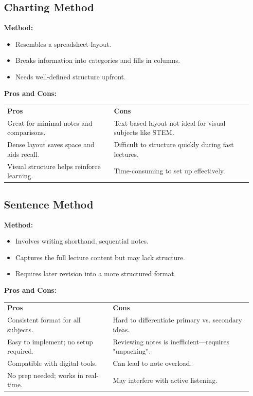 \vspace{1em}
\subsection*{Charting Method}

\textbf{Method:}
\begin{itemize}
    \item Resembles a spreadsheet layout.
    \item Breaks information into categories and fills in columns.
    \item Needs well-defined structure upfront.
\end{itemize}

\textbf{Pros and Cons:}

\begin{tabularx}{\textwidth}{>{\raggedright\arraybackslash}X>{\raggedright\arraybackslash}X}
    \rowcolor{gray!15} \textbf{Pros}           & \textbf{Cons}                                              \\
    Great for minimal notes and comparisons.   & Text-based layout not ideal for visual subjects like STEM. \\
    Dense layout saves space and aids recall.  & Difficult to structure quickly during fast lectures.       \\
    Visual structure helps reinforce learning. & Time-consuming to set up effectively.                      \\
\end{tabularx}

\vspace{1em}
\subsection*{Sentence Method}

\textbf{Method:}
\begin{itemize}
    \item Involves writing shorthand, sequential notes.
    \item Captures the full lecture content but may lack structure.
    \item Requires later revision into a more structured format.
\end{itemize}

\textbf{Pros and Cons:}

\begin{tabularx}{\textwidth}{>{\raggedright\arraybackslash}X>{\raggedright\arraybackslash}X}
    \rowcolor{gray!15} \textbf{Pros}      & \textbf{Cons}                                        \\
    Consistent format for all subjects.   & Hard to differentiate primary vs. secondary ideas.   \\
    Easy to implement; no setup required. & Reviewing notes is inefficient—requires "unpacking". \\
    Compatible with digital tools.        & Can lead to note overload.                           \\
    No prep needed; works in real-time.   & May interfere with active listening.                 \\
\end{tabularx}

